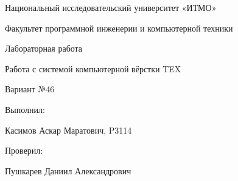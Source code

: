 \onehalfspacing
\begin{center}
    \par\large Национальный исследовательский университет «ИТМО»\\
    \vspace*{\baselineskip}
    \par\large Факультет программной инженерии и компьютерной техники\\
\end{center}

\vfill

\begin{center}
    \par\Large Лабораторная работа 
    \vspace*{\baselineskip}
    \par\large Работа с системой компьютерной вёрстки TEX \\ 
    \par\large Вариант №46 \\ 
\end{center}

\vfill

\begin{flushright}
    \par\large Выполнил: \\ 
    \par\large Касимов Аскар Маратович, P3114
    \par\large Проверил: \\ 
    \par\large Пушкарев Даниил Александрович
\end{flushright}

\vfill
